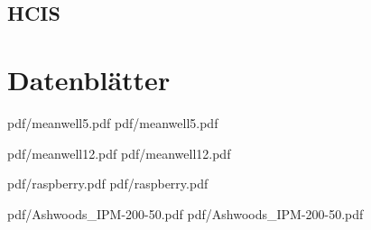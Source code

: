 \newpage

\section{HCIS}

\newpage

\chapter{Datenblätter}

 {pdf/meanwell5.pdf}
 {pdf/meanwell5.pdf}


 {pdf/meanwell12.pdf}
 {pdf/meanwell12.pdf}

 {pdf/raspberry.pdf}
 {pdf/raspberry.pdf}

 {pdf/Ashwoods_IPM-200-50.pdf}
 {pdf/Ashwoods_IPM-200-50.pdf}

